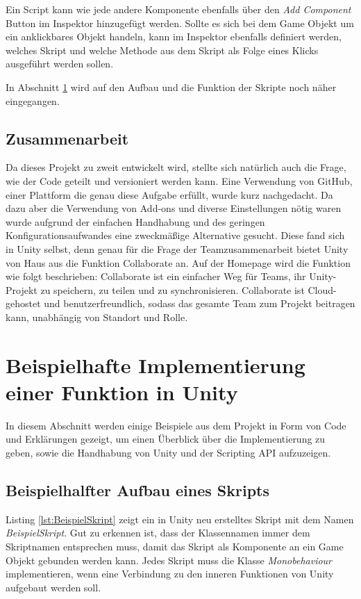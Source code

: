 Ein Script kann wie jede andere Komponente ebenfalls über den \textit{Add Component} Button im Inspektor hinzugefügt werden. Sollte es sich bei dem Game Objekt um ein anklickbares Objekt handeln, kann im Inspektor ebenfalls definiert werden, welches Skript und welche Methode aus dem Skript als Folge eines Klicks ausgeführt werden sollen.

In Abschnitt \ref{u_beispiele} wird auf den Aufbau und die Funktion der Skripte noch näher eingegangen.


\subsection{Zusammenarbeit}
Da dieses Projekt zu zweit entwickelt wird, stellte sich natürlich auch die Frage, wie der Code geteilt und versioniert werden kann. Eine Verwendung von GitHub, einer Plattform die genau diese Aufgabe erfüllt, wurde kurz nachgedacht. Da dazu aber die Verwendung von Add-ons und diverse Einstellungen nötig waren wurde aufgrund der einfachen Handhabung und des geringen Konfigurationsaufwandes eine zweckmäßige Alternative gesucht. Diese fand sich in Unity selbst, denn genau für die Frage der Teamzusammenarbeit bietet Unity von Haus aus die Funktion Collaborate an. Auf der Homepage wird die Funktion wie folgt beschrieben: \glqq Collaborate ist ein einfacher Weg für Teams, ihr Unity-Projekt zu speichern, zu teilen und zu synchronisieren. Collaborate ist Cloud-gehostet und benutzerfreundlich, sodass das gesamte Team zum Projekt beitragen kann, unabhängig von Standort und Rolle. \grqq ~\cite{F_6.3_UnityCollab} 

\section{Beispielhafte Implementierung einer Funktion in Unity}
\label{u_beispiele}
In diesem Abschnitt werden einige Beispiele aus dem Projekt in Form von Code und Erklärungen gezeigt, um einen Überblick über die Implementierung zu geben, sowie die Handhabung von Unity und der Scripting API aufzuzeigen.

\subsection{Beispielhalfter Aufbau eines Skripts}
Listing \ref{lst:BeispielSkript} zeigt ein in Unity neu erstelltes Skript mit dem Namen \textit{BeispielSkript}. Gut zu erkennen ist, dass der Klassennamen immer dem Skriptnamen entsprechen muss, damit das Skript als Komponente an ein Game Objekt gebunden werden kann. Jedes Skript muss die Klasse \textit{Monobehaviour} implementieren, wenn eine Verbindung zu den inneren Funktionen von Unity aufgebaut werden soll.

